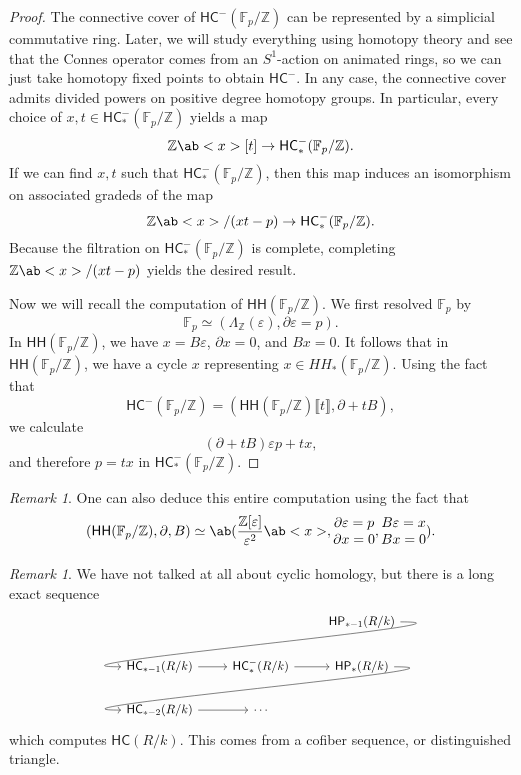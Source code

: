 \documentclass[10pt]{amsart}
\theoremstyle{definition}
\theoremstyle{remark}
\newtheorem{rmk}[thm]{Remark}
\theoremstyle{plain}
\theoremstyle{definition}
\theoremstyle{remark}
\newcommand{\Z}{\mathbb{Z}}
\newcommand{\F}{\mathbb{F}}
\newcommand{\ep}{\varepsilon}
\newcommand{\ms}[1]{\mathsf{#1}}
\newcommand{\1}{\mathbf{1}}
\newcommand{\2}{\mathbf{2}}
\newcommand{\3}{\mathbf{3}}
\newcommand{\ps}[1]{\llbracket #1 \rrbracket}
\newcommand{\HC}{\ms{HC}}
\newcommand{\HH}{\ms{HH}}
\newcommand{\HP}{\ms{HP}}
\begin{document}
\begin{proof}
    The connective cover of $\HC^-(\F_p/\Z)$ can be represented by a simplicial commutative ring. Later, we will study everything using homotopy theory and see that the Connes operator comes from an $S^1$-action on animated rings, so we can just take homotopy fixed points to obtain $\HC^-$. In any case, the connective cover admits divided powers on positive degree homotopy groups. In particular, every choice of $x,t \in \HC_*^-(\F_p/\Z)$ yields a map
    \[ \Z\ab<x>[t] \to \HC_*^-(\F_p/\Z). \]
    If we can find $x,t$ such that $\HC_*^-(\F_p/\Z)$, then this map induces an isomorphism on associated gradeds of the map
    \[ \Z\ab<x>/(xt-p) \to \HC_*^-(\F_p/\Z). \]
    Because the filtration on $\HC_*^-(\F_p/\Z)$ is complete, completing $\Z\ab<x>/(xt-p)$ yields the desired result.

    Now we will recall the computation of $\HH(\F_p/\Z)$. We first resolved $\F_p$ by
    \[ \F_p \simeq (\Lambda_{\Z}(\ep), \partial \ep = p). \]
    In $\HH(\F_p/\Z)$, we have $x = B \ep$, $\partial x = 0$, and $Bx = 0$. It follows that in $\HH(\F_p/\Z)$, we have a cycle $x$ representing $x \in HH_*(\F_p / \Z)$. Using the fact that
    \[ \HC^-(\F_p/\Z) = (\HH(\F_p/\Z)\ps{t}, \partial + tB),\]
    we calculate
    \[ (\partial + tB) \ep p + tx, \]
    and therefore $p = tx$ in $\HC_*^-(\F_p/\Z)$.
\end{proof}

\begin{rmk}
    One can also deduce this entire computation using the fact that 
    \[ (\HH(\F_p/\Z), \partial, B) \simeq \ab(\frac{\Z[\ep]}{\ep^2} \ab<x>, \Vectorstack{{\partial \ep = p} {\partial x = 0}}, \Vectorstack{{B \ep = x} {Bx = 0}}). \]
\end{rmk}

\begin{rmk}
    We have not talked at all about cyclic homology, but there is a long exact sequence
    \begin{equation*}
    \begin{tikzcd}
        & & \HP_{*-1}(R/k) \arrow[out=0, in=180, looseness=1]{dll} \\
        \HC_{*-1}(R/k) \ar{r} & \HC_*^-(R/k) \ar{r} & \HP_*(R/k) \arrow[out=0,in=180, looseness=1]{dll} \\
        \HC_{*-2}(R/k) \ar{r} & \cdots
    \end{tikzcd}
    \end{equation*}
    which computes $\HC(R/k)$. This comes from a cofiber sequence, or distinguished triangle.
\end{rmk}
\end{document}
